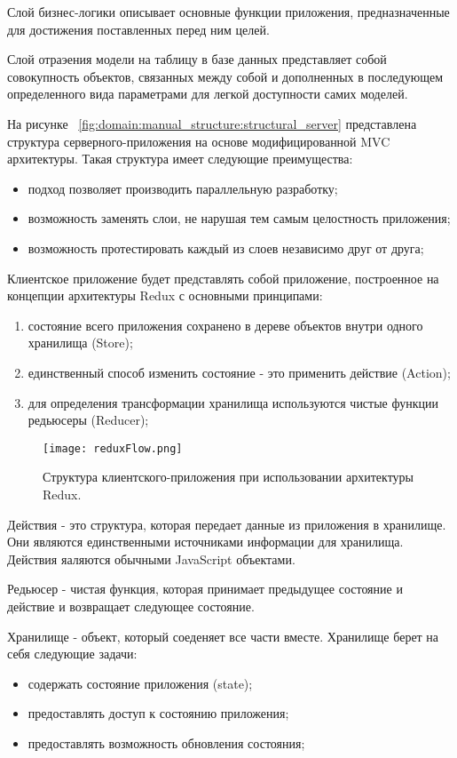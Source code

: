 Слой бизнес-логики описывает основные функции приложения, предназначенные для достижения поставленных перед ним целей.

Слой отраэения модели на таблицу в базе данных представляет собой совокупность объектов, связанных между собой и дополненных в последующем определенного вида параметрами для легкой доступности самих моделей.

На рисунке ~\ref{fig:domain:manual_structure:structural_server} представлена структура серверного-приложения на основе модифицированной MVC архитектуры. Такая структура имеет следующие преимущества:
\begin{itemize}
  \item подход позволяет производить параллельную разработку;
  \item возможность заменять слои, не нарушая тем самым целостность приложения;
  \item возможность протестировать каждый из слоев независимо друг от друга;
\end{itemize}

Клиентское приложение будет представлять собой приложение, построенное на концепции архитектуры Redux с основными принципами:
\begin{enumerate}
  \item состояние всего приложения сохранено в дереве объектов внутри одного хранилища (Store);
  \item единственный способ изменить состояние - это применить действие (Action);
  \item для определения трансформации хранилища используются чистые функции редьюсеры (Reducer);
\end{enumerate}
\begin{figure}[ht]
\centering
  \texttt{[image: reduxFlow.png]}  
  \caption{ Структура клиентского-приложения при использовании архитектуры Redux. }
  \label{fig:domain:manual_structure:structural_client}
\end{figure}

Действия - это структура, которая передает данные из приложения в хранилище. Они являются единственными источниками информации для хранилища. Действия яаляются обычными JavaScript объектами.

Редьюсер - чистая функция, которая принимает предыдущее состояние и действие и возвращает следующее состояние.

Хранилище - объект, который соеденяет все части вместе. Хранилище берет на себя следующие задачи:
\begin{itemize}
  \item содержать состояние приложения (state);
  \item предоставлять доступ к состоянию приложения;
  \item предоставлять возможность обновления состояния;
\end{itemize}

